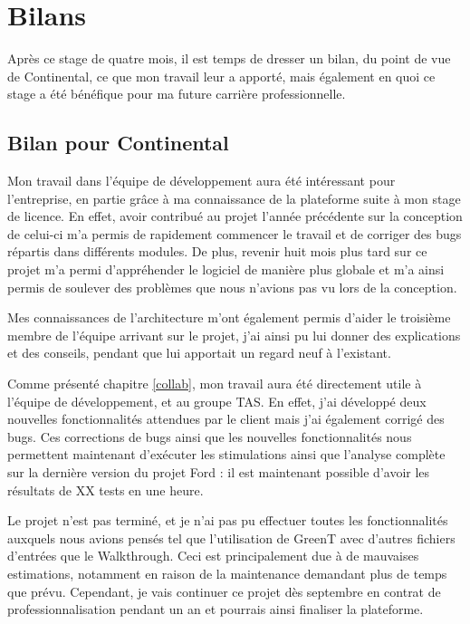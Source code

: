 \chapter{Bilans}
\putminitoc

Après ce stage de quatre mois, il est temps de dresser un bilan, du point de vue de Continental, ce que mon travail leur a apporté, mais également en quoi ce stage a été bénéfique pour ma future carrière professionnelle.

\section{Bilan pour Continental}
Mon travail dans l'équipe de développement aura été intéressant pour l'entreprise, en partie grâce à ma connaissance de la plateforme suite à mon stage de licence. En effet, avoir contribué au projet l'année précédente sur la conception de celui-ci m'a permis de rapidement commencer le travail et de corriger des bugs répartis dans différents modules. De plus, revenir huit mois plus tard sur ce projet m'a permi d'appréhender le logiciel de manière plus globale et m'a ainsi permis de soulever des problèmes que nous n'avions pas vu lors de la conception.

Mes connaissances de l'architecture m'ont également permis d'aider le troisième membre de l'équipe arrivant sur le projet, j'ai ainsi pu lui donner des explications et des conseils, pendant que lui apportait un regard neuf à l'existant.

Comme présenté chapitre \ref{collab}, mon travail aura été directement utile à l'équipe de développement, et au groupe TAS. En effet, j'ai développé deux nouvelles fonctionnalités attendues par le client mais j'ai également corrigé des bugs. Ces corrections de bugs ainsi que les nouvelles fonctionnalités nous permettent maintenant d'exécuter les stimulations ainsi que l'analyse complète sur la dernière version du projet Ford : il est maintenant possible d'avoir les résultats de XX tests en une heure.

Le projet n'est pas terminé, et je n'ai pas pu effectuer toutes les fonctionnalités auxquels nous avions pensés tel que l'utilisation de GreenT avec d'autres fichiers d'entrées que le Walkthrough. Ceci est principalement due à de mauvaises estimations, notamment en raison de la maintenance demandant plus de temps que prévu. Cependant, je vais continuer ce projet dès septembre en contrat de professionnalisation pendant un an et pourrais ainsi finaliser la plateforme.

